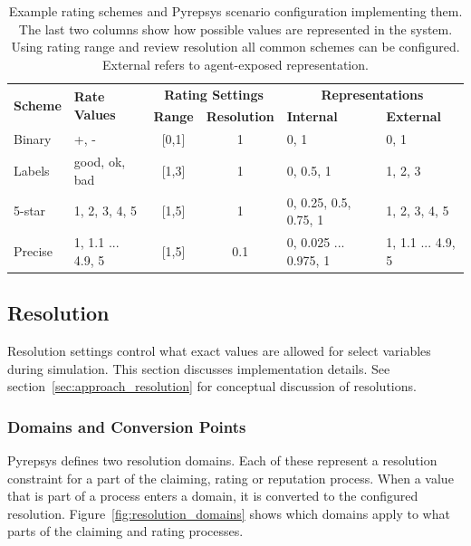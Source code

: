 \documentclass[%
    ]{\PathToTumTemplate/thesis/tum_thesis}
\begin{document}
\begin{table}[tbp]
\centering
\begin{tabular}{@{}llccll@{}}
\toprule
\multirow{2}{*}[-0.2em]{\textbf{Scheme}} & \multirow{2}{*}[-0.2em]{\textbf{Rate Values}} & \multicolumn{2}{c}{\textbf{Rating Settings}} & \multicolumn{2}{c}{\textbf{Representations}} \\ \cmidrule(lr){3-4} \cmidrule(lr){5-6} 
                        &                                  & \textbf{Range}    & \textbf{Resolution} & \textbf{Internal}    & \textbf{External}   \\ \midrule
Binary          & +, -                     & {[}0,1{]}                & 1               & 0, 1 & 0, 1           \\
Labels & good, ok, bad       & {[}1,3{]}                & 1               & 0, 0.5, 1 & 1, 2, 3          \\
5-star          & 1, 2, 3, 4, 5            & {[}1,5{]}                & 1               & 0, 0.25, 0.5, 0.75, 1 & 1, 2, 3, 4, 5            \\ 
Precise & 1, 1.1 ... 4.9, 5 & {[}1,5{]}                & 0.1         & 0, 0.025 ... 0.975, 1 & 1, 1.1 ... 4.9, 5         \\
\bottomrule
\end{tabular}
\caption{
	Example rating schemes and Pyrepsys scenario configuration implementing them.
	The last two columns show how possible values are represented in the system.
	Using rating range and review resolution all common schemes can be configured.
	External refers to agent-exposed representation.
}
\label{tab:rating_scheme_examples_pyrepsys_config}
\end{table}


\subsection{Resolution}\label{sec:impl_resolution}

Resolution settings control what exact values are allowed for select variables during simulation.
This section discusses implementation details.
See section~\ref{sec:approach_resolution} for conceptual discussion of resolutions.

\subsubsection{Domains and Conversion Points}
Pyrepsys defines two resolution domains.
Each of these represent a resolution constraint for a part of the claiming, rating or reputation process.
When a value that is part of a process enters a domain, it is converted to the configured resolution.
Figure~\ref{fig:resolution_domains} shows which domains apply to what parts of the claiming and rating processes.
\end{document}
